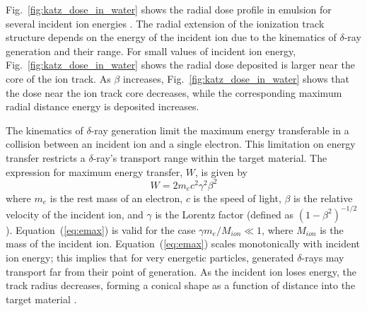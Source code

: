 Fig.~\ref{fig:katz_dose_in_water} shows the radial dose profile in emulsion for several incident ion energies \cite{Kobetich:1968im,Katz:1968fo,Katz:1969uo}. 
The radial extension of the ionization track structure depends on the energy of the incident ion due to the kinematics of $\delta$-ray generation and their range.
For small values of incident ion energy, Fig.~\ref{fig:katz_dose_in_water} shows the radial dose deposited is larger near the core of the ion track. 
As $\beta$ increases, Fig.~\ref{fig:katz_dose_in_water} shows that the dose near the ion track core decreases, while the corresponding maximum radial distance energy is deposited increases.

The kinematics of $\delta$-ray generation limit the maximum energy transferable in a collision between an incident ion and a single electron. 
This limitation on energy transfer restricts a $\delta$-ray's transport range within the target material. 
The expression for maximum energy transfer, $W$, is given by
\begin{equation}
    \label{eq:emax}
    W = 2m_{e}c^2\gamma^2\beta^2
\end{equation}
where $m_e$ is the rest mass of an electron, $c$ is the speed of light, $\beta$ is the relative velocity of the incident ion, and $\gamma$ is the Lorentz factor (defined as $(1-\beta^2)^{-1/2}$).
Equation~(\ref{eq:emax}) is valid for the case $\gamma m_e / M_{ion} \ll 1$, where $M_{ion}$ is the mass of the incident ion. 
Equation~(\ref{eq:emax}) scales monotonically with incident ion energy; this implies that for very energetic particles, generated $\delta$-rays may transport far from their point of generation.
As the incident ion loses energy, the track radius decreases, forming a conical shape as a function of distance into the target material \cite{Stapor:1988ws}.

